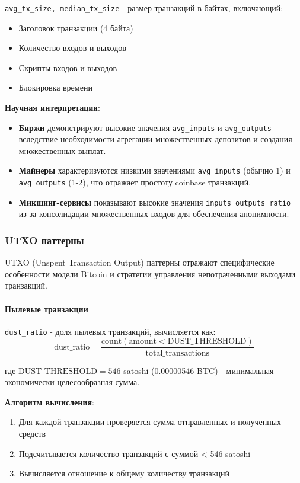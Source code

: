 \texttt{avg\_tx\_size, median\_tx\_size} - размер транзакций в байтах, включающий:
\begin{itemize}
    \item Заголовок транзакции (4 байта)
    \item Количество входов и выходов
    \item Скрипты входов и выходов
    \item Блокировка времени
\end{itemize}

\textbf{Научная интерпретация}: 
\begin{itemize}
    \item \textbf{Биржи} демонстрируют высокие значения \texttt{avg\_inputs} и \texttt{avg\_outputs} вследствие необходимости агрегации множественных депозитов и создания множественных выплат.
    \item \textbf{Майнеры} характеризуются низкими значениями \texttt{avg\_inputs} (обычно 1) и \texttt{avg\_outputs} (1-2), что отражает простоту coinbase транзакций.
    \item \textbf{Микшинг-сервисы} показывают высокие значения \texttt{inputs\_outputs\_ratio} из-за консолидации множественных входов для обеспечения анонимности.
\end{itemize}

\subsubsection{UTXO паттерны}

UTXO (Unspent Transaction Output) паттерны отражают специфические особенности модели Bitcoin и стратегии управления непотраченными выходами транзакций.

\paragraph{Пылевые транзакции}

\texttt{dust\_ratio} - доля пылевых транзакций, вычисляется как:
\begin{equation}
    \text{dust\_ratio} = \frac{\text{count}(\text{amount} < \text{DUST\_THRESHOLD})}{\text{total\_transactions}}
\end{equation}

где $\text{DUST\_THRESHOLD} = 546$ satoshi (0.00000546 BTC) - минимальная экономически целесообразная сумма.

\textbf{Алгоритм вычисления}:
\begin{enumerate}
    \item Для каждой транзакции проверяется сумма отправленных и полученных средств
    \item Подсчитывается количество транзакций с суммой < 546 satoshi
    \item Вычисляется отношение к общему количеству транзакций
\end{enumerate}


